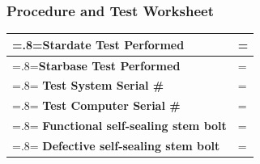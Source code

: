 \documentclass[a4paper,12pt]{article}
\theoremstyle{definition}
\def\arraystretch{1.5}%
\begin{document}
\subsubsection{Procedure and Test Worksheet}

\bgroup
\def\arraystretch{1.5}%
\begin{tabularx}{\textwidth}{|>{\hsize=.8\hsize\linewidth=\hsize}X|>{\hsize=1.2\hsize\linewidth=\hsize}X|}
	\hline
	\textbf{Stardate Test Performed}           & \\ \hline
	\textbf{Starbase Test Performed}           & \\ \hline
	\textbf{Test System Serial \#}             & \\ \hline
	\textbf{Test Computer Serial \#}           & \\ \hline
	\textbf{Functional self-sealing stem bolt} & \\ \hline
	\textbf{Defective self-sealing stem bolt}  & \\ \hline
\end{tabularx}
\egroup




\bgroup
\end{document}

